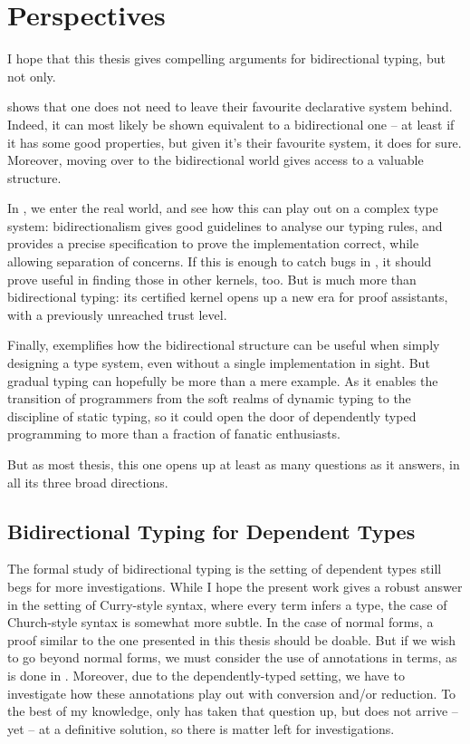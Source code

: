 \chapter{Perspectives}
\label{chap:future-work}

I hope that this thesis gives compelling arguments for bidirectional typing, but
not only.

 shows that one does not need to leave their favourite declarative
system behind. Indeed, it can most likely  be shown equivalent to a bidirectional one
– at least if it has some good properties, but given it’s their favourite system,
it does for sure. Moreover, moving over to the bidirectional world gives access
to a valuable structure.

In , we enter the real world, and see how this can play out
on a complex type system: bidirectionalism gives good guidelines to analyse
our typing rules,
and provides a precise specification to prove the implementation correct,
while allowing separation of concerns. If this is enough
to catch bugs in , it should prove useful in finding those in other kernels, too.
But  is much more than bidirectional typing: its certified kernel opens
up a new era for proof assistants, with a previously unreached trust level.

Finally,
 exemplifies how the bidirectional structure can be useful when
simply designing a type system, even without a single implementation in sight.
But gradual typing can hopefully be more than a mere
example. As it enables the transition of programmers from the soft realms of
dynamic typing to the discipline of static typing, so it could open the door of
dependently typed programming to more than a fraction of fanatic enthusiasts.

But as most thesis, this one opens up at least as many questions as it answers,
in all its three broad directions.

\section{Bidirectional Typing for Dependent Types}

The formal study of bidirectional typing is the setting of dependent types still begs for
more investigations. While I hope the present work gives a robust answer in the setting
of Curry-style syntax, where every term infers a type,
the case of Church-style syntax is somewhat more subtle. In the case of normal forms,
a proof similar to the one presented in this thesis should be doable. But if we wish to
go beyond normal forms, we must consider the use of annotations in terms, as is done in
. Moreover, due to the dependently-typed
setting, we have to investigate how these annotations play out with conversion and/or reduction.
To the best of my knowledge, only \citeauthor{McBride2022} has taken that question up,
but does not arrive – yet – at a definitive solution, so there is matter left for investigations.

